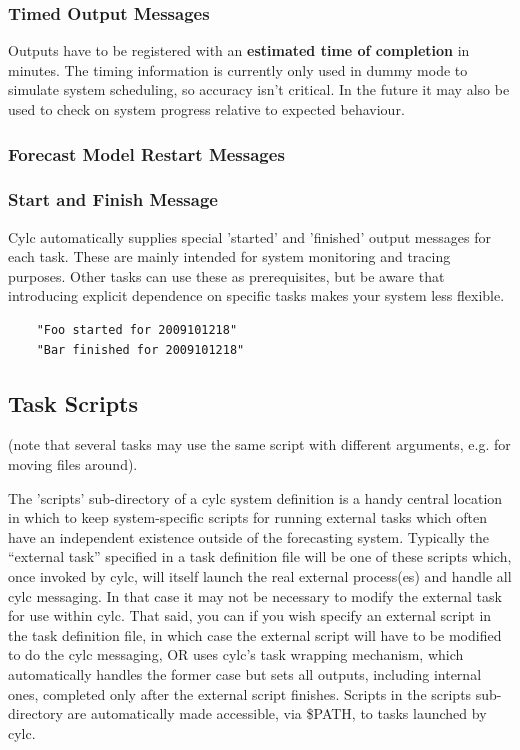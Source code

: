 \documentclass[11pt,a4paper]{article}
\begin{document}
\subsubsection{Timed Output Messages}

Outputs have to be registered with an {\bf estimated time of completion}
in minutes. The timing information is currently only used in dummy mode
to simulate system scheduling, so accuracy isn't critical. In the future
it may also be used to check on system progress relative to expected
behaviour.


\subsubsection{Forecast Model Restart Messages}

\subsubsection{Start and Finish Message}

Cylc automatically supplies special 'started' and 'finished' output
messages for each task. These are mainly intended for system monitoring
and tracing purposes. Other tasks can use these as prerequisites, but be
aware that introducing explicit dependence on specific tasks makes your
system less flexible.

\begin{lstlisting}
    "Foo started for 2009101218"
    "Bar finished for 2009101218"
\end{lstlisting}


\pagebreak
\subsection{Task Scripts}
\label{TaskScripts}

(note that several tasks may use the same script with different
arguments, e.g. for moving files around).

The 'scripts' sub-directory of a cylc system definition is a handy
central location in which to keep system-specific scripts for running
external tasks which often have an independent existence outside of the
forecasting system. Typically the ``external task'' specified in a task
definition file will be one of these scripts which, once invoked by
cylc, will itself launch the real external process(es) and handle all
cylc messaging. In that case it may not be necessary to modify the
external task for use within cylc.  That said, you can if you wish
specify an external script in the task definition file, in which case 
the external script will have to be modified to do the cylc messaging,
OR uses cylc's task wrapping mechanism, which automatically handles the
former case but sets all outputs, including internal ones, completed
only after the external script finishes.  Scripts in the scripts
sub-directory are automatically made accessible, via \$PATH, to tasks
launched by cylc. 
\end{document}
